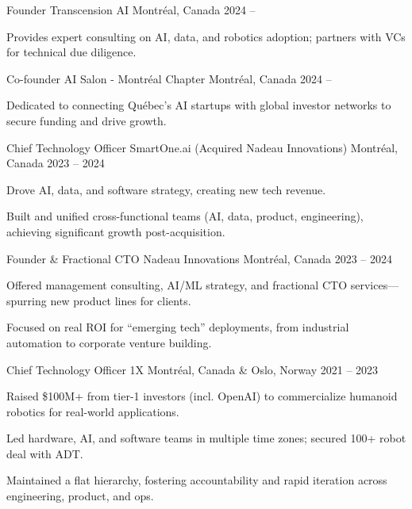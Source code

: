 \documentclass[11pt, letterpaper]{awesome-cv}
\begin{document}
\begin{cventries}

\cventry
{Founder}
{Transcension AI}
{Montréal, Canada}
{2024 -- }
{
\begin{cvitems}
\item {Provides expert consulting on AI, data, and robotics adoption; partners with VCs for technical due diligence.}
\end{cvitems}
}

\cventry
{Co-founder}
{AI Salon - Montréal Chapter}
{Montréal, Canada}
{2024 -- }
{
\begin{cvitems}
\item {Dedicated to connecting Québec’s AI startups with global investor networks to secure funding and drive growth.}
\end{cvitems}
}

\cventry
{Chief Technology Officer}
{SmartOne.ai (Acquired Nadeau Innovations)}
{Montréal, Canada}
{2023 -- 2024}
{
\begin{cvitems}
\item {Drove AI, data, and software strategy, creating new tech revenue.}
\item {Built and unified cross-functional teams (AI, data, product, engineering), achieving significant growth post-acquisition.}
\end{cvitems}
}

\cventry
{Founder \& Fractional CTO}
{Nadeau Innovations}
{Montréal, Canada}
{2023 -- 2024}
{
\begin{cvitems}
\item {Offered management consulting, AI/ML strategy, and fractional CTO services—spurring new product lines for clients.}
\item {Focused on real ROI for “emerging tech” deployments, from industrial automation to corporate venture building.}
\end{cvitems}
}

\cventry
{Chief Technology Officer}
{1X}
{Montréal, Canada \& Oslo, Norway}
{2021 -- 2023}
{
\begin{cvitems}
\item {Raised \$100M+ from tier-1 investors (incl. OpenAI) to commercialize humanoid robotics for real-world applications.}
\item {Led hardware, AI, and software teams in multiple time zones; secured 100+ robot deal with ADT.}
\item {Maintained a flat hierarchy, fostering accountability and rapid iteration across engineering, product, and ops.}
\end{cvitems}
}


\end{cventries}
\end{document}
